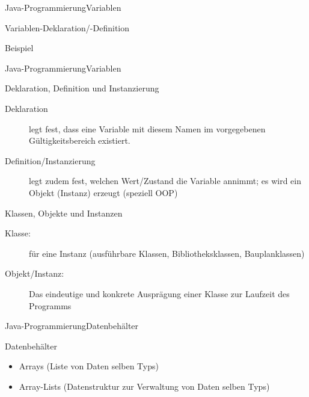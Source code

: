 \begin{frame}[shrink]{Java-Programmierung}{Variablen}
    \begin{block}{Variablen-Deklaration/-Definition}
    \end{block}
    \begin{block}{Beispiel}
    \end{block}
\end{frame}
\begin{frame}{Java-Programmierung}{Variablen}
    \begin{block}{Deklaration, Definition und Instanzierung}
        \begin{description}
            \item[Deklaration]legt fest, dass eine Variable mit diesem Namen im vorgegebenen Gültigkeitsbereich existiert.
            \item[Definition/Instanzierung]legt zudem fest, welchen Wert/Zustand die Variable annimmt; es wird ein Objekt (Instanz) erzeugt (speziell OOP) 
        \end{description}
    \end{block}
    \begin{block}{Klassen, Objekte und Instanzen}
        \begin{description}
            \item[Klasse:] für eine Instanz (ausführbare Klassen, Bibliotheksklassen, Bauplanklassen)
            \item[Objekt/Instanz:]Das eindeutige und konkrete Ausprägung einer Klasse zur Laufzeit des Programms
        \end{description}
    \end{block}
\end{frame}

\begin{frame}{Java-Programmierung}{Datenbehälter}
    \begin{block}{Datenbehälter}
        \begin{itemize}
            \item Arrays (Liste von Daten selben Typs)
            \item Array-Lists (Datenstruktur zur Verwaltung von Daten selben Typs)
        \end{itemize}
    \end{block}
\end{frame}


